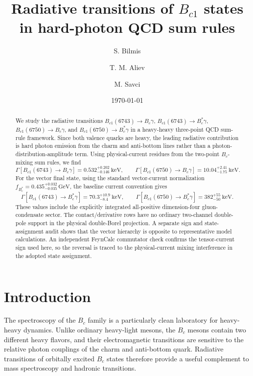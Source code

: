 \documentclass[aps,prd,preprint,nofootinbib,superscriptaddress]{revtex4-2}
\newcommand{\Bc}{B_c}
\newcommand{\Bcst}{B_c^\ast}
\newcommand{\Bcone}{B_{c1}}
\newcommand{\GeV}{\mathrm{GeV}}
\newcommand{\keV}{\mathrm{keV}}
\begin{document}
\title{Radiative transitions of \(B_{c1}\) states in hard-photon QCD sum rules}

\author{S. Bilmis}
\author{T. M. Aliev}
\author{M. Savci}

\date{\today}

\begin{abstract}
We study the radiative transitions
\(\Bcone(6743)\to \Bc\gamma\), \(\Bcone(6743)\to \Bcst\gamma\),
\(\Bcone(6750)\to \Bc\gamma\), and \(\Bcone(6750)\to \Bcst\gamma\)
in a heavy-heavy three-point QCD sum-rule framework.  Since both valence
quarks are heavy, the leading radiative contribution is hard photon emission
from the charm and anti-bottom lines rather than a photon-distribution-amplitude
term.  Using physical-current residues from the two-point \(B_c\)-mixing sum
rules, we find
\[
\Gamma[\Bcone(6743)\to \Bc\gamma]=0.532^{+0.202}_{-0.146}~\keV,\qquad
\Gamma[\Bcone(6750)\to \Bc\gamma]=10.04^{+2.41}_{-1.75}~\keV .
\]
For the vector final state, using the standard vector-current normalization
\(f_{\Bcst}=0.435^{+0.032}_{-0.035}\,\GeV\), the baseline current convention gives
\[
\Gamma[\Bcone(6743)\to \Bcst\gamma]=70.3^{+10.9}_{-8.4}~\keV,\qquad
\Gamma[\Bcone(6750)\to \Bcst\gamma]=382^{+55}_{-50}~\keV .
\]
These values include the explicitly integrated all-positive dimension-four
gluon-condensate sector.  The contact/derivative rows have no ordinary
two-channel double-pole support in the physical double-Borel projection.  A
separate sign and state-assignment audit shows that the vector hierarchy is
opposite to representative model calculations.  An independent FeynCalc
commutator check confirms the tensor-current sign used here, so the reversal is
traced to the physical-current mixing interference in the adopted state
assignment.
\end{abstract}

\maketitle

\section{Introduction}
\label{sec:intro}

The spectroscopy of the \(B_c\) family is a particularly clean laboratory for
heavy-heavy dynamics.  Unlike ordinary heavy-light mesons, the \(B_c\) mesons
contain two different heavy flavors, and their electromagnetic transitions are
sensitive to the relative photon couplings of the charm and anti-bottom quark.
Radiative transitions of orbitally excited \(B_c\) states therefore provide a
useful complement to mass spectroscopy and hadronic transitions.
\end{document}
